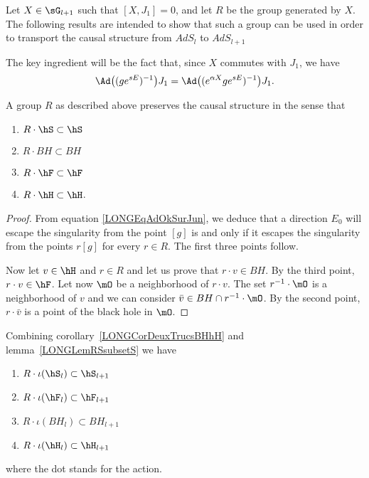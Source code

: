 Let $X\in\sG_{l+1}$ such that $[X,J_1]=0$, and let $R$ be the group generated by $X$. The following results are intended to show that such a group can be used in order to transport the causal structure from $AdS_l$ to $AdS_{l+1}$

The key ingredient will be the fact that, since $X$ commutes with $J_1$, we have
\begin{equation}        \label{LONGEqAdOkSurJun}
    \Ad\big( (g e^{sE})^{-1} \big)J_1=\Ad\big( ( e^{\alpha X}g e^{sE})^{-1} \big)J_1.
\end{equation}

\begin{lemma}        \label{LONGLemRSsubsetS}
    A group $R$ as described above preserves the causal structure in the sense that
    \begin{multicols}{2}
    \begin{enumerate}

        \item
            $R\cdot\hS\subset\hS$
        \item
            $R\cdot BH\subset BH$
        \item
            $R\cdot \hF\subset\hF$
        \item
            $R\cdot \hH\subset\hH$.

    \end{enumerate}
    \end{multicols}
\end{lemma}

\begin{proof}
    From equation \eqref{LONGEqAdOkSurJun}, we deduce that a direction $E_0$ will escape the singularity from the point $[g]$ is and only if it escapes the singularity from the points $r[g]$ for every $r\in R$. The first three points follow.

    Now let $v\in\hH$ and $r\in R$ and let us prove that $r\cdot v\in BH$. By the third point, $r\cdot v\in\hF$. Let now $\mO$ be a neighborhood of $r\cdot v$. The set $r^{-1}\cdot \mO$ is a neighborhood of $v$ and we can consider $\bar v\in BH\cap r^{-1}\cdot\mO$. By the second point, $r\cdot \bar v$ is a point of the black hole in $\mO$.
\end{proof}

\begin{remark}        \label{LONGRemdqnqRSlsubsetSlpu}
    Combining corollary~\ref{LONGCorDeuxTrucsBHhH} and lemma~\ref{LONGLemRSsubsetS} we have
    \begin{multicols}{2}
    \begin{enumerate}
        \item
            $ R\cdot\iota(\hS_l)\subset\hS_{l+1}$
        \item
            $ R\cdot\iota(\hF_l)\subset\hF_{l+1}$
        \item
            $ R\cdot\iota(BH_{l})\subset BH_{l+1}$
        \item
            $ R\cdot\iota(\hH_{l})\subset\hH_{l+1}$
    \end{enumerate}
    \end{multicols}
    where the dot stands for the action.
\end{remark}


